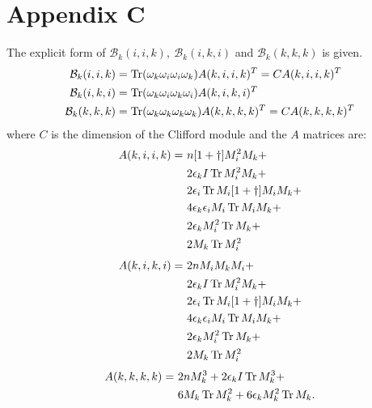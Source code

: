 \section*{Appendix C}
The explicit form of $\mathcal{B}_k(i,i,k), \ \mathcal{B}_k(i,k,i)$ and $\mathcal{B}_k(k,k,k)$ is given.
\begin{align}
\mathcal{B}_k(i,i,k) &= \operatorname{Tr}(\omega_k \omega_i \omega_i \omega_k)A(k, i, i, k)^T = CA(k,i,i,k)^T \notag \\ 
\mathcal{B}_k(i,k,i) &= \operatorname{Tr}(\omega_k \omega_i \omega_k \omega_i)A(k, i, k, i)^T \notag \\
\mathcal{B}_k(k,k,k) &= \operatorname{Tr}(\omega_k \omega_k \omega_k \omega_k)A(k, k, k, k)^T = CA(k,k,k,k)^T \notag
\end{align}
where $C$ is the dimension of the Clifford module and the $A$ matrices are:
\begin{align}
A(k,i,i,k) = \ &n [1+\dagger] M_i^2 M_k + \notag \\
&2\epsilon_k I \operatorname{Tr} M_i^2 M_k + \notag \\
&2\epsilon_i \operatorname{Tr} M_i [1 + \dagger] M_i M_k + \notag \\
&4\epsilon_k \epsilon_i M_i \operatorname{Tr} M_i M_k + \notag \\
&2\epsilon_k M_i^2 \operatorname{Tr} M_k + \notag \\
&2M_k \operatorname{Tr} M_i^2
\end{align}
\begin{align}
A(k,i,k,i) = \ &2n M_i M_k M_i + \notag \\
&2\epsilon_k I \operatorname{Tr} M_i^2 M_k + \notag \\
&2\epsilon_i \operatorname{Tr} M_i [1+\dagger] M_i M_k + \notag \\
&4\epsilon_k \epsilon_i M_i \operatorname{Tr} M_i M_k + \notag \\
&2\epsilon_k M_i^2 \operatorname{Tr} M_k + \notag \\
&2M_k \operatorname{Tr} M_i^2
\end{align}
\begin{align}
A(k,k,k,k) = \ &2n M_k^3 + 2\epsilon_k I \operatorname{Tr} M_k^3 + \notag \\
&6 M_k \operatorname{Tr} M_k^2 + 6\epsilon_k M_k^2 \operatorname{Tr} M_k.
\end{align}

